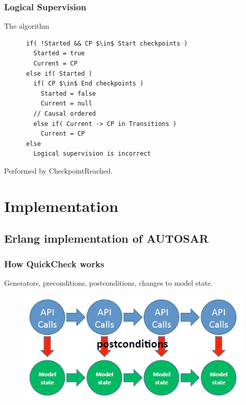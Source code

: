 \documentclass{beamer}
\begin{document}
\begin{frame}[fragile]
  \frametitle{Logical Supervision}
  \begin{block}{The algorithm}
    \begin{lstlisting}
      if( !Started && CP $\in$ Start checkpoints )
        Started = true
        Current = CP
      else if( Started )
        if( CP $\in$ End checkpoints )
          Started = false
          Current = null
        // Causal ordered
        else if( Current -> CP in Transitions )
          Current = CP
      else
        Logical supervision is incorrect
    \end{lstlisting}
  \end{block}
  Performed by CheckpointReached.
\end{frame}

\section{Implementation}


\subsection{Erlang implementation of AUTOSAR}

\begin{frame}
  \frametitle{How QuickCheck works}
  Generators, preconditions, postconditions, changes to model state.
  \begin{figure}
    \includegraphics[keepaspectratio, width=0.7\linewidth]{api_calls}
  \end{figure}
\end{frame}
\end{document}
